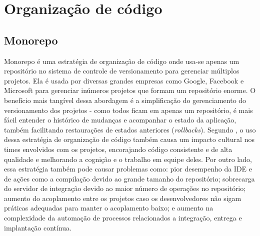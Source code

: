 \section{Organização de código}

\subsection{Monorepo}
Monorepo é uma estratégia de organização de código onde usa-se apenas um repositório no sistema de controle de versionamento para gerenciar múltiplos projetos. Ela é usada por diversas grandes empresas como Google, Facebook e Microsoft para gerenciar inúmeros projetos que formam um repositório enorme. O benefício mais tangível dessa abordagem é a simplificação do gerenciamento do versionamento dos projetos - como todos ficam em apenas um repositório, é mais fácil entender o histórico de mudanças e acompanhar o estado da aplicação, também facilitando restaurações de estados anteriores (\emph{rollbacks}). Segundo , o uso dessa estratégia de organização de código também causa um impacto cultural nos times envolvidos com os projetos, encorajando código consistente e de alta qualidade e melhorando a cognição e o trabalho em equipe deles. Por outro lado, essa estratégia também pode causar problemas como: pior desempenho da IDE e de ações como a compilação devido ao grande tamanho do repositório; sobrecarga do servidor de integração devido ao maior número de operações no repositório; aumento do acoplamento entre os projetos caso os desenvolvedores não sigam práticas adequadas para manter o acoplamento baixo; e aumento na complexidade da automação de processos relacionados a integração, entrega e implantação contínua. \cite{monorepo-polirepo-semaphoreci, monorepo-do-or-do-not, monorepo-polirepo-nicolas}




